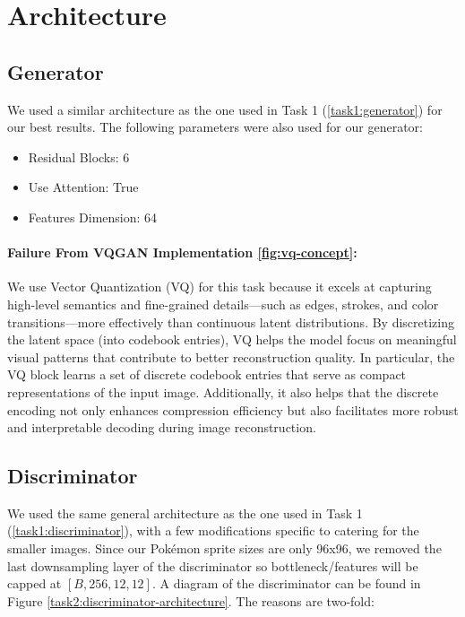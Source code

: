 \documentclass[twoside,english,notitlepage]{report}
\begin{document}
\section{Architecture}
\subsection{Generator}\label{task2:generator}
We used a similar architecture as the one used in Task 1 (\ref{task1:generator}) for our best results. The following parameters were also used for our generator:

\begin{multicols}{3}
    \begin{itemize}
        \item Residual Blocks: 6
        \item Use Attention: True
        \item Features Dimension: 64
    \end{itemize}
\end{multicols}

\paragraph{Failure From VQGAN Implementation \ref{fig:vq-concept}:}We use Vector Quantization (VQ) for this task because it excels at capturing high-level semantics and fine-grained details—such as edges, strokes, and color transitions—more effectively than continuous latent distributions. By discretizing the latent space (into codebook entries), VQ helps the model focus on meaningful visual patterns that contribute to better reconstruction quality.
\noindent In particular, the VQ block learns a set of discrete codebook entries that serve as compact representations of the input image. Additionally, it also helps that the discrete encoding not only enhances compression efficiency but also facilitates more robust and interpretable decoding during image reconstruction.


\subsection{Discriminator}\label{task2:discriminator}
We used the same general architecture as the one used in Task 1 (\ref{task1:discriminator}), with a few modifications specific to catering for the smaller images. Since our Pokémon sprite sizes are only 96x96, we removed the last downsampling layer of the discriminator so bottleneck/features will be capped at $[B, 256, 12, 12]$. A diagram of the discriminator can be found in Figure \ref{task2:discriminator-architecture}.
\noindent The reasons are two-fold: 
\end{document}
